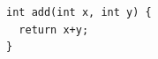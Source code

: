 \documentclass{jarticle}
\begin{document}
\begin{Verbatim}
int add(int x, int y) {
  return x+y;
}
\end{Verbatim}
\end{document}
